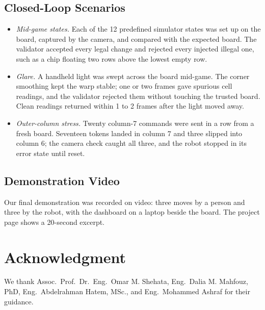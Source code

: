 \documentclass[conference]{IEEEtran}
\begin{document}
\subsection{Closed-Loop Scenarios}
\begin{itemize}
\item \emph{Mid-game states.} Each of the 12 predefined simulator states was set up on the board, captured by the camera, and compared with the expected board. The validator accepted every legal change and rejected every injected illegal one, such as a chip floating two rows above the lowest empty row.
\item \emph{Glare.} A handheld light was swept across the board mid-game. The corner smoothing kept the warp stable; one or two frames gave spurious cell readings, and the validator rejected them without touching the trusted board. Clean readings returned within 1 to 2 frames after the light moved away.
\item \emph{Outer-column stress.} Twenty column-7 commands were sent in a row from a fresh board. Seventeen tokens landed in column 7 and three slipped into column 6; the camera check caught all three, and the robot stopped in its error state until reset.
\end{itemize}

\subsection{Demonstration Video}
Our final demonstration was recorded on video: three moves by a person and three by the robot, with the dashboard on a laptop beside the board. The project page shows a 20-second excerpt.

\section*{Acknowledgment}
We thank Assoc.~Prof.~Dr.~Eng.~Omar M. Shehata, Eng.~Dalia M. Mahfouz, PhD, Eng.~Abdelrahman Hatem, MSc., and Eng.~Mohammed Ashraf for their guidance.



\end{document}

